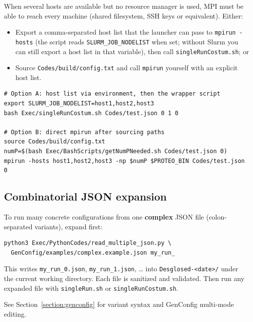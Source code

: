 When several hosts are available but no resource manager is used, MPI must be able to reach every machine (shared filesystem, SSH keys or equivalent). Either:

\begin{itemize}
  \item Export a comma-separated host list that the launcher can pass to \texttt{mpirun -hosts} (the script reads \texttt{SLURM\_JOB\_NODELIST} when set; without Slurm you can still export a host list in that variable), then call \texttt{singleRunCostum.sh}; or
  \item Source \texttt{Codes/build/config.txt} and call \texttt{mpirun} yourself with an explicit host list.
\end{itemize}

\begin{lstlisting}[style=bashstyle,caption={Multi-machine launch without Slurm.},captionpos=b]
# Option A: host list via environment, then the wrapper script
export SLURM_JOB_NODELIST=host1,host2,host3
bash Exec/singleRunCostum.sh Codes/test.json 0 1 0

# Option B: direct mpirun after sourcing paths
source Codes/build/config.txt
numP=$(bash Exec/BashScripts/getNumPNeeded.sh Codes/test.json 0)
mpirun -hosts host1,host2,host3 -np $numP $PROTEO_BIN Codes/test.json 0
\end{lstlisting}

\subsection{Combinatorial JSON expansion}

To run many concrete configurations from one \textbf{complex} JSON file (colon-separated variants), expand first:

\begin{lstlisting}[style=bashstyle,caption={Expand complex JSON into concrete files.},captionpos=b]
python3 Exec/PythonCodes/read_multiple_json.py \
  GenConfig/examples/complex.example.json my_run_
\end{lstlisting}

This writes \texttt{my\_run\_0.json}, \texttt{my\_run\_1.json}, \ldots{} into \texttt{Desglosed-<date>/} under the current working directory. Each file is sanitized and validated. Then run any expanded file with \texttt{singleRun.sh} or \texttt{singleRunCostum.sh}.

See Section~\ref{section:genconfig} for variant syntax and GenConfig multi-mode editing.

